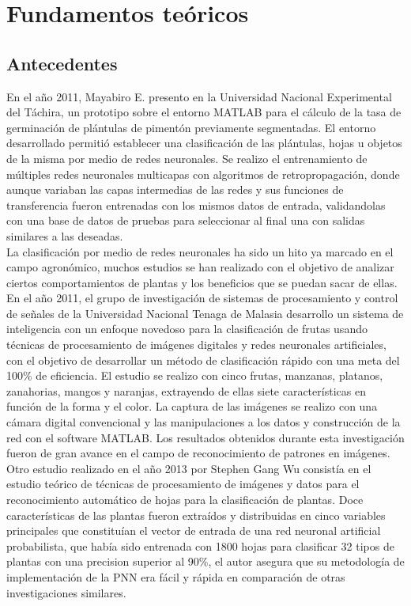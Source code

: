 \chapter{Fundamentos te\'oricos}

\section{Antecedentes}

En el año 2011, Mayabiro E. presento en la Universidad Nacional Experimental del Táchira, un prototipo sobre el entorno MATLAB para el cálculo de la tasa de germinación de plántulas de pimentón previamente segmentadas. El entorno desarrollado permitió establecer una clasificación de las plántulas, hojas u objetos de la misma por medio de redes neuronales. Se realizo el entrenamiento de múltiples redes neuronales multicapas con algoritmos de retropropagación, donde aunque variaban las capas intermedias de las redes y sus funciones de transferencia fueron entrenadas con los mismos  datos de entrada, validandolas con una base de datos de pruebas para seleccionar al final una con salidas similares a las deseadas.\\

La clasificación por medio de redes neuronales ha sido un hito ya marcado en el campo agronómico, muchos estudios se han realizado con el objetivo de analizar ciertos comportamientos de plantas y los beneficios que se puedan sacar de ellas. En el año 2011, el grupo de investigación de sistemas de procesamiento y control de señales de la Universidad Nacional Tenaga de Malasia desarrollo un sistema de inteligencia con un enfoque novedoso para la clasificación de frutas usando técnicas de procesamiento de imágenes digitales y redes neuronales artificiales, con el objetivo de desarrollar un método de clasificación rápido con una meta del 100\% de eficiencia. El estudio se realizo con cinco frutas, manzanas, platanos, zanahorias, mangos y naranjas, extrayendo de ellas siete características en función de la forma y el color. La captura de las imágenes se realizo con una cámara digital convencional y las manipulaciones a los datos y construcción de la red con el software MATLAB. Los resultados obtenidos durante esta investigación fueron de gran avance en el campo de reconocimiento de patrones en imágenes.\\


Otro estudio realizado en el año 2013 por Stephen Gang Wu consistía en el estudio teórico de técnicas de procesamiento de imágenes y datos para el reconocimiento automático de hojas para la clasificación de plantas. Doce características de las plantas fueron extraídos y distribuidas en cinco variables principales que constituían el vector de entrada de una red neuronal artificial probabilista, que había sido entrenada con 1800 hojas para clasificar 32 tipos de plantas con una precision superior al 90\%, el autor asegura que su metodología de implementación de la PNN era fácil y rápida en comparación de otras investigaciones similares.\\

